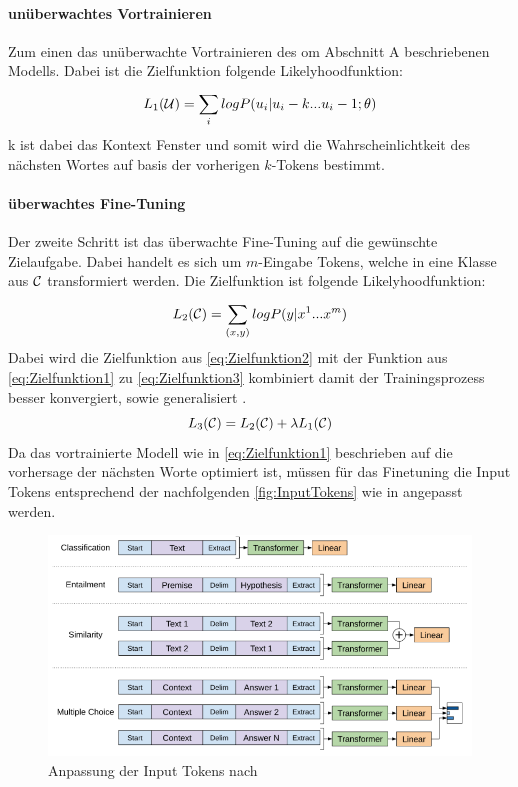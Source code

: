 \documentclass[conference]{IEEEtran}
\begin{document}
\paragraph{unüberwachtes Vortrainieren}
Zum einen das unüberwachte Vortrainieren des om Abschnitt A beschriebenen Modells. Dabei ist die Zielfunktion folgende Likelyhoodfunktion:
\begin{equation}
    L_1({\cal U}) = \sum_{i}^{} log P( u_i|u_i-k ... u_i-1;\theta)
    \label{eq:Zielfunktion1}
\end{equation}
k ist dabei das Kontext Fenster und somit wird die Wahrscheinlichtkeit des nächsten Wortes auf basis der vorherigen $k$-Tokens bestimmt.
\paragraph{überwachtes Fine-Tuning}
Der zweite Schritt ist das überwachte Fine-Tuning auf die gewünschte Zielaufgabe. Dabei handelt es sich um $m$-Eingabe Tokens, welche in eine Klasse aus $\cal C$ transformiert werden. Die Zielfunktion ist folgende Likelyhoodfunktion:
\begin{equation}
    L_2({\cal C}) = \sum_{(x,y)}^{} log P(y|x^1 ... x^m)
    \label{eq:Zielfunktion2}
\end{equation}
Dabei wird die Zielfunktion aus \autoref{eq:Zielfunktion2} mit der Funktion aus \autoref{eq:Zielfunktion1} zu \autoref{eq:Zielfunktion3} kombiniert damit der Trainingsprozess besser konvergiert, sowie generalisiert \cite{radfordImprovingLanguageUnderstanding}.
\begin{equation}
    L_3({\cal C}) = L_2({\cal C}) + \lambda L_1({\cal C})
    \label{eq:Zielfunktion3}
\end{equation}
Da das vortrainierte Modell wie in \autoref{eq:Zielfunktion1} beschrieben auf die vorhersage der nächsten Worte optimiert ist, müssen für das Finetuning die Input Tokens entsprechend der nachfolgenden \autoref{fig:InputTokens} wie in \cite{radfordImprovingLanguageUnderstanding} angepasst werden.
\begin{figure}[htbp]
    \centerline{\includegraphics[width=\linewidth]{Bilder/TokenAnpassungGPT1.png}}
    \caption{Anpassung der Input Tokens nach \cite{radfordImprovingLanguageUnderstanding}}
\label{fig:InputTokens}
\end{figure}
\end{document}
